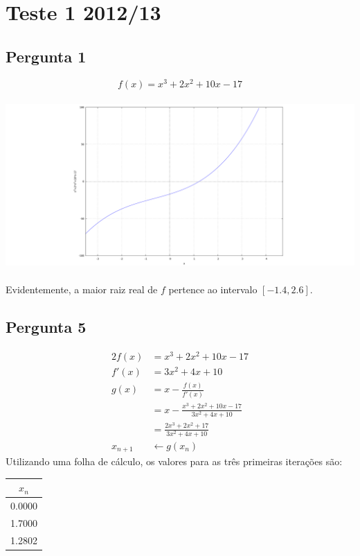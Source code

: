 \setcounter{chapter}{11}
\chapter{Teste 1 2012/13}
\section{Pergunta 1}
\begin{equation*}
	f(x)=x^3+2x^2+10x-17
\end{equation*}
\begin{center} \includegraphics[height=65mm,keepaspectratio]{plot2012T1-1} \end{center}
Evidentemente, a maior raiz real de $f$ pertence ao intervalo $[-1.4, 2.6]$.
\section{Pergunta 5}
\begin{alignat*}{2}
	f(x) &=x^3+2x^2+10x-17\\
	f'(x)&=3x^2+4x+10\\
	g(x) &=x-\frac{f(x)}{f'(x)}\\
	     &=x-\frac{x^3+2x^2+10x-17}{3x^2+4x+10}\\
	     &=\frac{2x^3+2x^2+17}{3x^2+4x+10}\\
	x_{n+1} &\leftarrow g(x_n) 
\end{alignat*}
Utilizando uma folha de cálculo, os valores para as três primeiras iterações são:
\begin{center}
\begin{tabular}{c}
	$x_n$ \\ \hline
	0.0000 \\
	1.7000 \\
	1.2802
\end{tabular}
\end{center}

